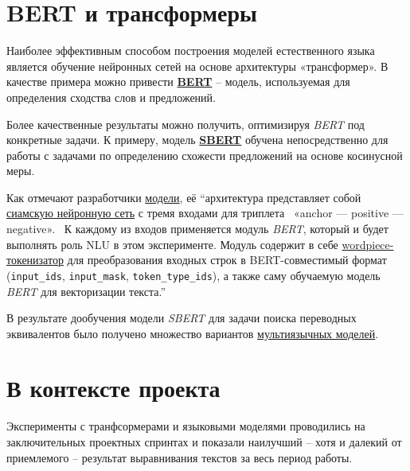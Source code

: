 \documentclass[
  letterpaper,
]{book}
\begin{document}
\hypertarget{sec-about_bert}{%
\section{BERT и трансформеры}\label{sec-about_bert}}

Наиболее эффективным способом построения моделей естественного языка
является обучение нейронных сетей на основе архитектуры «трансформер». В
качестве примера можно привести
\href{https://arxiv.org/abs/1810.04805}{\textbf{BERT}} -- модель,
используемая для определения сходства слов и предложений.

Более качественные результаты можно получить, оптимизируя \emph{BERT}
под конкретные задачи. К примеру, модель
\href{https://arxiv.org/pdf/1908.10084.pdf}{\textbf{SBERT}} обучена
непосредственно для работы с задачами по определению схожести
предложений на основе косинусной меры.

Как отмечают разработчики
\href{https://habr.com/ru/companies/sberdevices/articles/527576/}{модели},
её ``архитектура представляет собой
\href{https://en.wikipedia.org/wiki/Siamese_neural_network}{сиамскую
нейронную сеть} с тремя входами для триплета~ «anchor --- positive ---
negative».~ К каждому из входов применяется модуль \emph{BERT}, который
и будет выполнять роль NLU в этом эксперименте. Модуль содержит в себе
\href{https://paperswithcode.com/method/wordpiece}{wordpiece-токенизатор}
для преобразования входных строк в BERT-совместимый формат
(\texttt{input\_ids}, \texttt{input\_mask}, \texttt{token\_type\_ids}),
а также саму обучаемую модель \emph{BERT} для векторизации текста.''

В результате дообучения модели \emph{SBERT} для задачи поиска переводных
эквивалентов было получено множество вариантов
\href{https://huggingface.co/models?pipeline_tag=sentence-similarity\&sort=downloads\&search=multi}{мультиязычных
моделей}.

\hypertarget{sec-project_transformers}{%
\section{В контексте проекта}\label{sec-project_transformers}}

Эксперименты с транфсормерами и языковыми моделями проводились на
заключительных проектных спринтах и показали наилучший -- хотя и далекий
от приемлемого -- результат выравнивания текстов за весь период работы.
\end{document}
